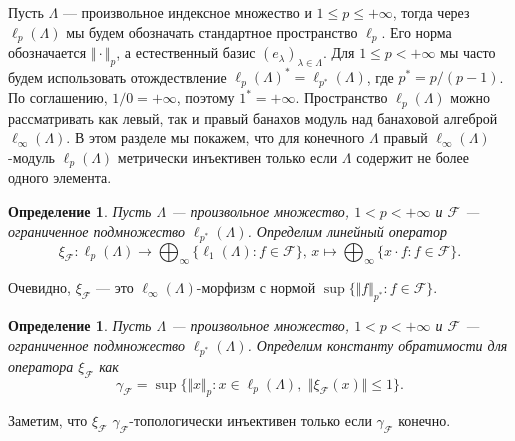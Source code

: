 \documentclass[12pt]{article}
\newtheorem{definition}[theorem]{Определение}
\begin{document}
Пусть $\Lambda$ --- произвольное индексное множество 
и $1\leq p\leq +\infty$, тогда через $\ell_p(\Lambda)$ мы будем обозначать 
стандартное пространство $\ell_p$. Его норма обозначается $\Vert\cdot\Vert_p$, а 
естественный базис $(e_\lambda)_{\lambda\in\Lambda}$. 
Для $1\leq p<+\infty$ мы часто будем использовать отождествление
$\ell_p(\Lambda)^*=\ell_{p^*}(\Lambda)$, где $p^*=p/(p-1)$. 
По соглашению, $1/0=+\infty$, поэтому $1^*=+\infty$. 
Пространство $\ell_p(\Lambda)$ можно рассматривать как левый, так и правый 
банахов модуль над банаховой алгеброй $\ell_\infty(\Lambda)$. В этом разделе 
мы покажем, что для конечного $\Lambda$ 
правый $\ell_\infty(\Lambda)$-модуль $\ell_p(\Lambda)$ метрически инъективен 
только если $\Lambda$ содержит не более одного элемента.

\begin{definition}\label{StdEmbd} 
    Пусть $\Lambda$ --- произвольное множество, $1<p<+\infty$ 
    и $\mathcal{F}$ --- ограниченное подмножество $\ell_{p^*}(\Lambda)$. 
    Определим линейный оператор
    \[
        \xi_{\mathcal{F}}: 
        \ell_p(\Lambda)\to\bigoplus_\infty\{\ell_1(\Lambda):f\in\mathcal{F}\},\,
        x \mapsto \bigoplus_\infty\{ x\cdot f: f\in\mathcal{F}\}.
    \]
\end{definition}

Очевидно, $\xi_{\mathcal{F}}$ --- это $\ell_\infty(\Lambda)$-морфизм с нормой 
$\sup\{\Vert f\Vert_{p^*}: f\in\mathcal{F}\}$.

\begin{definition}\label{StdEmbdCoercv}
    Пусть $\Lambda$ --- произвольное множество, $1<p<+\infty$ 
    и $\mathcal{F}$ --- ограниченное подмножество $\ell_{p^*}(\Lambda)$. 
    Определим константу обратимости для оператора $\xi_{\mathcal{F}}$ как
    \[
        \gamma_{\mathcal{F}}=\sup\{
            \Vert x\Vert_p: 
            x\in\ell_p(\Lambda),\,\, \Vert \xi_{\mathcal{F}}(x)\Vert\leq 1
        \}.
    \]
\end{definition}

Заметим, что $\xi_{\mathcal{F}}$ $\gamma_{\mathcal{F}}$-топологически инъективен 
только если $\gamma_{\mathcal{F}}$ конечно.
\end{document}
